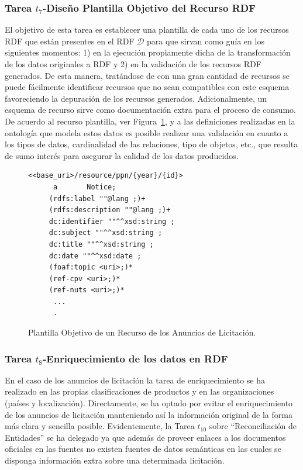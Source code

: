 \subsubsection{Tarea $t_7$-Diseño Plantilla Objetivo del Recurso RDF}
El objetivo de esta tarea es establecer una plantilla de cada uno de los recursos RDF que están 
presentes en el \dataset RDF $\mathcal{D}$ para que sirvan como guía en los siguientes momentos: 1) en la ejecución propiamente dicha 
de la transformación de los datos originales a \gls{RDF} y 2) en la validación de los recursos RDF generados. De esta manera, 
tratándose de \datasets con una gran cantidad de recursos se puede fácilmente identificar recursos que no sean 
compatibles con este esquema favoreciendo la depuración de los recursos generados. Adicionalmente, un esquema de 
recurso sirve como documentación extra para el proceso de consumo. 
%
De acuerdo al recurso plantilla, ver Figura~\ref{fig:ppn-template}, y a las definiciones realizadas en la ontología que modela estos datos 
es posible realizar una validación en cuanto a los tipos de datos, cardinalidad de las relaciones, tipo de objetos, etc., que 
resulta de sumo interés para asegurar la calidad de los datos producidos.
 
 \begin{figure}[!htp]
 \begin{lstlisting} 
<<base_uri>/resource/ppn/{year}/{id}>
      a       Notice;
     (rdfs:label ""@lang ;)+
     (rdfs:description ""@lang ;)+
     dc:identifier ""^^xsd:string ;
     dc:subject ""^^xsd:string ;
     dc:title ""^^xsd:string ;
     dc:date ""^^xsd:date ;
     (foaf:topic <uri>;)*
     (ref-cpv <uri>;)*
     (ref-nuts <uri>;)*
      ...
      .	
\end{lstlisting}
	\caption{Plantilla Objetivo de un Recurso de los Anuncios de Licitación.}
	\label{fig:ppn-template}
\end{figure}
% 
% 
% 
\subsubsection{Tarea $t_8$-Enriquecimiento de los datos en RDF}\label{t8-pscs}
En el caso de los anuncios de licitación la tarea de enriquecimiento se ha realizado 
en las propias clasificaciones de productos y en las organizaciones (países y localización). Directamente, 
se ha optado por evitar el enriquecimiento de los anuncios de licitación manteniendo así la información 
original de la forma más clara y sencilla posible. Evidentemente, la Tarea $t_{10}$ sobre ``Reconciliación de Entidades'' 
se ha delegado ya que además de proveer enlaces a los documentos oficiales en las fuentes no existen fuentes 
de datos semánticas en las cuales se disponga información extra sobre una determinada licitación.
% 

